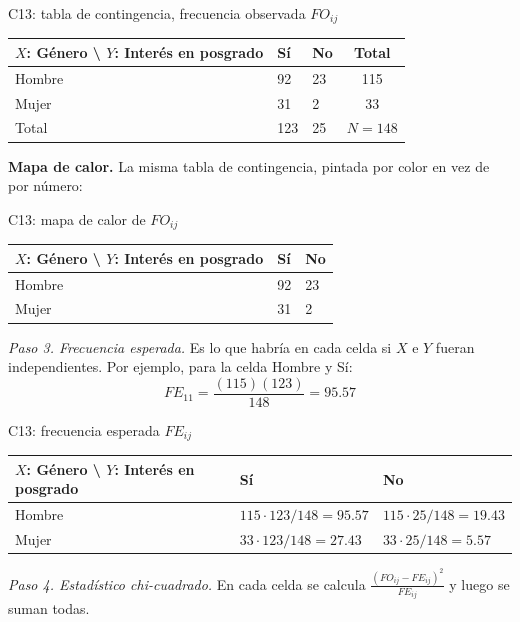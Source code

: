 \begin{mitabla}{C13: tabla de contingencia, frecuencia observada $FO_{ij}$}
\begin{tabular}{L{3.8cm}C{3.00cm}C{3.00cm}|c}
\toprule
$X$: Género \textbackslash{} $Y$: Interés en posgrado & Sí & No & Total \\
\midrule
Hombre & 92 & 23 & 115 \\
Mujer & 31 & 2 & 33 \\
\midrule
Total & 123 & 25 & $N = 148$ \\
\bottomrule
\end{tabular}
\end{mitabla}

\textbf{Mapa de calor.} La misma tabla de contingencia, pintada por color en vez de por número:

\begin{mitabla}{C13: mapa de calor de $FO_{ij}$}
\begin{tabular}{L{3.8cm}C{3.00cm}C{3.00cm}}
\toprule
$X$: Género \textbackslash{} $Y$: Interés en posgrado & Sí & No \\
\midrule
Hombre & 92 & 23 \\
Mujer & 31 & 2 \\
\bottomrule
\end{tabular}
\end{mitabla}

\textit{Paso 3. Frecuencia esperada.} Es lo que habría en cada celda si $X$ e $Y$ fueran independientes. Por ejemplo, para la celda Hombre y Sí:
\[
FE_{11} = \frac{(115)(123)}{148} = 95.57
\]

\begin{mitabla}{C13: frecuencia esperada $FE_{ij}$}
\begin{tabular}{L{3.8cm}C{3.00cm}C{3.00cm}}
\toprule
$X$: Género \textbackslash{} $Y$: Interés en posgrado & Sí & No \\
\midrule
Hombre & $115\cdot123/148 = 95.57$ & $115\cdot25/148 = 19.43$ \\
Mujer & $33\cdot123/148 = 27.43$ & $33\cdot25/148 = 5.57$ \\
\bottomrule
\end{tabular}
\end{mitabla}

\textit{Paso 4. Estadístico chi-cuadrado.} En cada celda se calcula $\frac{(FO_{ij}-FE_{ij})^2}{FE_{ij}}$ y luego se suman todas.

